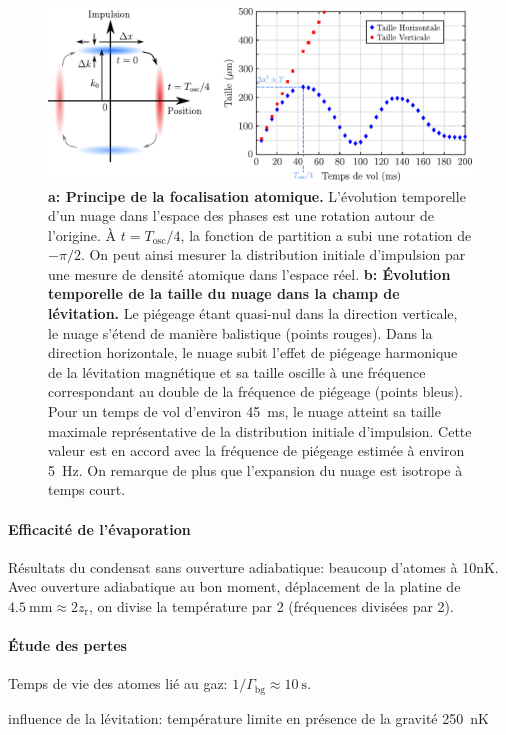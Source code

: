 \begin{figure}
\centering
\includegraphics[width=\textwidth]{Fig/Modif_exp/focalisation_atomique.pdf}
\caption{\textbf{a: Principe de la focalisation atomique.} L'évolution temporelle d'un nuage dans l'espace des phases est une rotation autour de l'origine. À $t=T_{\mathrm{osc}}/4$, la fonction de partition a subi une rotation de $-\pi/2$. On peut ainsi mesurer la distribution initiale d'impulsion par une mesure de densité atomique dans l'espace réel. \textbf{b: Évolution temporelle de la taille du nuage dans la champ de lévitation.} Le piégeage étant quasi-nul dans la direction verticale, le nuage s'étend de manière balistique (points rouges). Dans la direction horizontale, le nuage subit l'effet de piégeage harmonique de la lévitation magnétique et sa taille oscille à une fréquence correspondant au double de la fréquence de piégeage (points bleus). Pour un temps de vol d'environ \SI{45}{\milli\second}, le nuage atteint sa taille maximale représentative de la distribution initiale d'impulsion. Cette valeur est en accord avec la fréquence de piégeage estimée à environ \SI{5}{\hertz}. On remarque de plus que l'expansion du nuage est isotrope à temps court.}
\label{fig:focalisation_atomique}
\end{figure}




\paragraph*{Efficacité de l'évaporation}
Résultats du condensat sans ouverture adiabatique: beaucoup d'atomes à 10nK. Avec ouverture adiabatique au bon moment, déplacement de la platine de $\SI{4.5}{\milli\metre}\approx 2 z_{\mathrm{r}}$, on divise la température par 2 (fréquences divisées par 2).



\paragraph*{Étude des pertes}
Temps de vie des atomes lié au gaz: $1/\Gamma_{\mathrm{bg}}\approx\SI{10}{\second}$.








influence de la lévitation: température limite en présence de la gravité \SI{250}{\nano\kelvin}
